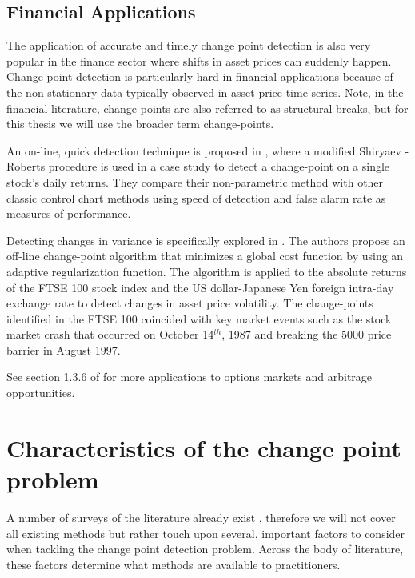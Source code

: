 \subsection{Financial Applications}
The application of accurate and timely change point detection is also very popular in the finance sector where shifts in asset prices can suddenly happen. Change point detection is particularly hard in financial applications because of the non-stationary data typically observed in asset price time series. Note, in the financial literature, change-points  are also referred to as structural breaks, but for this thesis we will use the broader term change-points.

An on-line, quick detection technique is proposed in  \cite{pepelyshev2015real}, where a modified Shiryaev - Roberts procedure is used in a case study to detect a change-point on a single stock's daily returns. They compare their non-parametric method with other classic control chart methods using speed of detection and false alarm rate as measures of performance.

Detecting changes in variance is specifically explored in  \cite{lavielle2007adaptive}. The authors propose an off-line change-point algorithm that minimizes a global cost function by using an adaptive regularization function. The algorithm is applied to the absolute returns of the FTSE 100 stock index and the US dollar-Japanese Yen foreign intra-day exchange rate to detect changes in asset price volatility. The change-points  identified in the FTSE 100 coincided with key market events such as the stock market crash that occurred on October 14$^{th}$, 1987 and breaking the 5000 price barrier in August 1997.

See section 1.3.6 of \cite{tartakovsky2014sequential} for more applications to options markets and arbitrage opportunities.

\section{Characteristics of the change point problem}
A number of surveys of the literature already exist \cite{aminikhanghahi2017survey} \cite{niu2016multiple}, therefore we will not cover all existing methods but rather touch upon several, important factors to consider when tackling the change point detection problem. Across the body of literature, these factors determine what methods are available to practitioners. %

